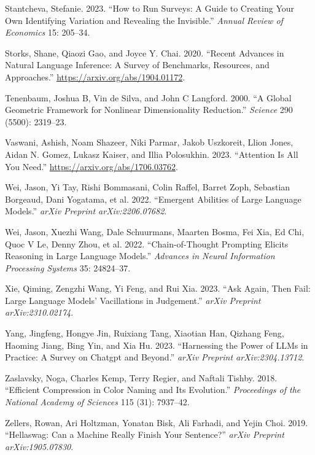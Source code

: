 \documentclass[
]{article}
\newlength{\cslhangindent}
\newenvironment{CSLReferences}[2] %
 {\begin{list}{}{%
  \setlength{\itemindent}{0pt}
  \setlength{\leftmargin}{0pt}
  \setlength{\parsep}{0pt}
  \ifodd #1
   \setlength{\leftmargin}{\cslhangindent}
   \setlength{\itemindent}{-1\cslhangindent}
  \fi
  \setlength{\itemsep}{#2\baselineskip}}}
 {\end{list}}
\begin{document}
\begin{CSLReferences}{1}{0}
Stantcheva, Stefanie. 2023. {``How to Run Surveys: A Guide to Creating
Your Own Identifying Variation and Revealing the Invisible.''}
\emph{Annual Review of Economics} 15: 205--34.

Storks, Shane, Qiaozi Gao, and Joyce Y. Chai. 2020. {``Recent Advances
in Natural Language Inference: A Survey of Benchmarks, Resources, and
Approaches.''} \url{https://arxiv.org/abs/1904.01172}.

Tenenbaum, Joshua B, Vin de Silva, and John C Langford. 2000. {``A
Global Geometric Framework for Nonlinear Dimensionality Reduction.''}
\emph{Science} 290 (5500): 2319--23.

Vaswani, Ashish, Noam Shazeer, Niki Parmar, Jakob Uszkoreit, Llion
Jones, Aidan N. Gomez, Lukasz Kaiser, and Illia Polosukhin. 2023.
{``Attention Is All You Need.''} \url{https://arxiv.org/abs/1706.03762}.

Wei, Jason, Yi Tay, Rishi Bommasani, Colin Raffel, Barret Zoph,
Sebastian Borgeaud, Dani Yogatama, et al. 2022. {``Emergent Abilities of
Large Language Models.''} \emph{arXiv Preprint arXiv:2206.07682}.

Wei, Jason, Xuezhi Wang, Dale Schuurmans, Maarten Bosma, Fei Xia, Ed
Chi, Quoc V Le, Denny Zhou, et al. 2022. {``Chain-of-Thought Prompting
Elicits Reasoning in Large Language Models.''} \emph{Advances in Neural
Information Processing Systems} 35: 24824--37.

Xie, Qiming, Zengzhi Wang, Yi Feng, and Rui Xia. 2023. {``Ask Again,
Then Fail: Large Language Models' Vacillations in Judgement.''}
\emph{arXiv Preprint arXiv:2310.02174}.

Yang, Jingfeng, Hongye Jin, Ruixiang Tang, Xiaotian Han, Qizhang Feng,
Haoming Jiang, Bing Yin, and Xia Hu. 2023. {``Harnessing the Power of
LLMs in Practice: A Survey on Chatgpt and Beyond.''} \emph{arXiv
Preprint arXiv:2304.13712}.

Zaslavsky, Noga, Charles Kemp, Terry Regier, and Naftali Tishby. 2018.
{``Efficient Compression in Color Naming and Its Evolution.''}
\emph{Proceedings of the National Academy of Sciences} 115 (31):
7937--42.

Zellers, Rowan, Ari Holtzman, Yonatan Bisk, Ali Farhadi, and Yejin Choi.
2019. {``Hellaswag: Can a Machine Really Finish Your Sentence?''}
\emph{arXiv Preprint arXiv:1905.07830}.

\end{CSLReferences}
\end{document}
